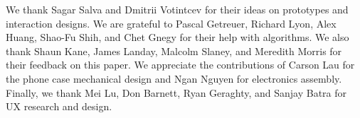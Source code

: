 \begin{acks}
We thank Sagar Salva and Dmitrii Votintcev for their ideas on prototypes and interaction designs. We are grateful to Pascal Getreuer, Richard Lyon, Alex Huang, Shao-Fu Shih, and Chet Gnegy for their help with algorithms. We also thank Shaun Kane, James Landay, Malcolm Slaney, and Meredith Morris for their feedback on this paper.  We appreciate the contributions of Carson Lau for the phone case mechanical design and Ngan Nguyen for electronics assembly. Finally, we thank Mei Lu, Don Barnett, Ryan Geraghty, and Sanjay Batra for UX research and design.
\end{acks}

